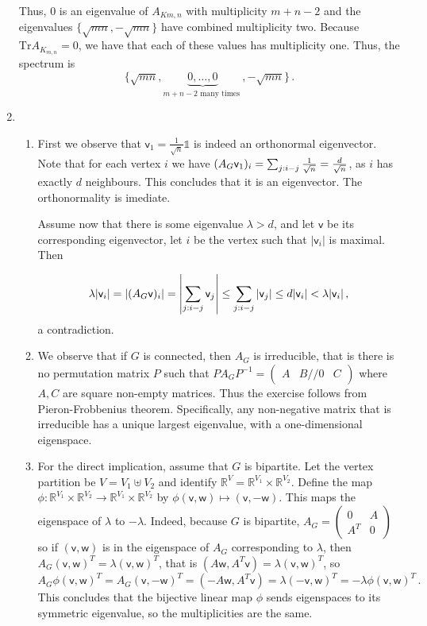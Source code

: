 \documentclass[kulak]{tplt}
\theoremstyle{definition}
\newcommand{\R}{\mathbb{R}}
\newcommand{\vv}{\mathsf{v}}
\newcommand{\vw}{\mathsf{w}}
\newcommand{\Tr}{\mathrm{Tr}}
\begin{document}
\begin{enumerate}
Thus, $0$ is an eigenvalue of $A_{K{m, n}}$ with multiplicity $m+n-2$ and the eigenvalues $\{ \sqrt{mn}, -\sqrt{mn}\}$ have combined multiplicity two.
Because $\Tr A_{K_{m, n}} =0 $, we have that each of these values has multiplicity one.
Thus, the spectrum is 
$$ \{ \sqrt{mn}, \underbrace{0, \ldots, 0}_{m+n-2 \text{ many times }}, -\sqrt{mn} \} \, . $$

\item 
\begin{enumerate}
\item 
First we observe that $\vv_1 = \frac{1}{\sqrt{n}} \mathbb{1}$ is indeed an orthonormal eigenvector.
Note that for each vertex $i$ we have $(A_G \vv_1)_i = \sum_{j : i\-- j} \frac{1}{\sqrt{n}} = \frac{d}{\sqrt{n}}$, as $i$ has exactly $d$ neighbours.
This concludes that it is an eigenvector.
The orthonormality is imediate.

Assume now that there is some eigenvalue $\lambda > d$, and let $\vv $ be its corresponding eigenvector, let $i$ be the vertex such that $|\vv_i|$ is maximal.
Then 

$$\lambda |\vv_i | = |(A_G \vv)_i| = \left|\sum_{j : i\-- j} \vv_j \right| \leq \sum_{j : i\-- j} |\vv_j| \leq d |\vv_i| < \lambda |\vv_i | \, ,$$
a contradiction.

\item 
We observe that if $G$ is connected, then $A_G$ is irreducible, that is there is no permutation matrix $P$ such that $PA_GP^{-1} = \begin{pmatrix}
A&B//0 & C\end{pmatrix}$ where $A, C$ are square non-empty matrices.
Thus the exercise follows from Pieron-Frobbenius theorem.
Specifically, any non-negative matrix that is irreducible has a unique largest eigenvalue, with a one-dimensional eigenspace.

\item 
For the direct implication, assume that $G$ is bipartite.
Let the vertex partition be $V = V_1 \uplus V_2$ and identify $\R^V = \R^{V_1} \times \R^{V_2}$.
Define the map $\phi : \R^{V_1} \times \R^{V_2} \to \R^{V_1} \times \R^{V_2}$ by $\phi(\vv, \vw) \mapsto (\vv, -\vw)$.
This maps the eigenspace of $\lambda $ to $-\lambda$.
Indeed, because $G$ is bipartite, $A_G = \begin{pmatrix}
0 & A\\
A^T & 0
\end{pmatrix}$ so if $(\vv, \vw)$ is in the eigenspace of $A_G$ corresponding to $\lambda$, then $A_G (\vv, \vw)^T = \lambda (\vv, \vw)^T$, that is $(A\vw, A^T\vv) = \lambda (\vv, \vw)^T$, so 
$$A_G \phi(\vv, \vw)^T = A_G (\vv, -\vw)^T = (-A\vw, A^T\vv) = \lambda (-\vv, \vw)^T  = -\lambda \phi(\vv, \vw)^T\, . $$
This concludes that the bijective linear map $\phi$ sends eigenspaces to its symmetric eigenvalue, so the multiplicities are the same.


\end{enumerate}
\end{enumerate}
\end{document}
